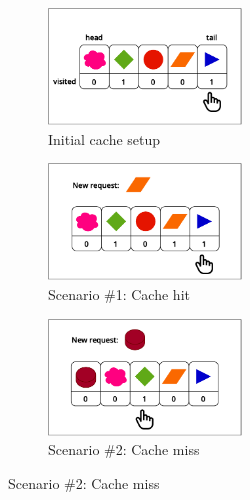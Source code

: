 \begin{figure}[h!]
    \centering
    \caption{Example of SIEVE algorithm}
    \label{fig:sieve-example}
    \begin{subfigure}[b]{0.3\textwidth}
        \centering        
        \includegraphics[height=3.1cm]{report/resources/sieve-drawing-1.pdf}
        \caption{Initial cache setup}
        \label{subfig:sieve1}
    \end{subfigure}
    \hfill
    \begin{subfigure}[b]{0.3\textwidth}
        \centering
        \includegraphics[height=3.1cm]{report/resources/sieve-drawing-2.pdf}
        \caption{Scenario \#1: Cache hit}
        \label{subfig:sieve2}
    \end{subfigure}
    \hfill
    \begin{subfigure}[b]{0.3\textwidth}
        \centering
        \includegraphics[height=3.1cm]{report/resources/sieve-drawing-3.pdf}
        \caption{Scenario \#2: Cache miss}
        \label{subfig:sieve3}
    \end{subfigure}
\end{figure}

